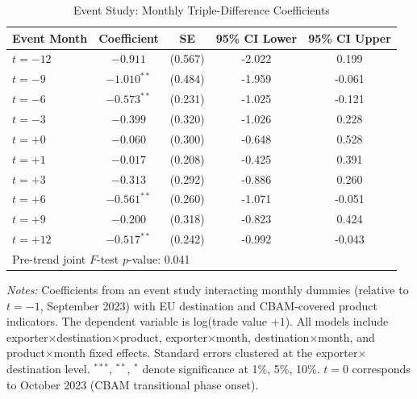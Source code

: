\begin{table}[htbp]
\centering
\caption{Event Study: Monthly Triple-Difference Coefficients}
\label{tab:eventstudy}
\begin{tabular}{lcccc}
\hline\hline
Event Month & Coefficient & SE & 95\% CI Lower & 95\% CI Upper \\
\hline
$t = -12$ & $-0.911$ & (0.567) & -2.022 & 0.199 \\
$t = -9$ & $-1.010^{**}$ & (0.484) & -1.959 & -0.061 \\
$t = -6$ & $-0.573^{**}$ & (0.231) & -1.025 & -0.121 \\
$t = -3$ & $-0.399$ & (0.320) & -1.026 & 0.228 \\
$t = +0$ & $-0.060$ & (0.300) & -0.648 & 0.528 \\
$t = +1$ & $-0.017$ & (0.208) & -0.425 & 0.391 \\
$t = +3$ & $-0.313$ & (0.292) & -0.886 & 0.260 \\
$t = +6$ & $-0.561^{**}$ & (0.260) & -1.071 & -0.051 \\
$t = +9$ & $-0.200$ & (0.318) & -0.823 & 0.424 \\
$t = +12$ & $-0.517^{**}$ & (0.242) & -0.992 & -0.043 \\
\hline
\multicolumn{5}{l}{Pre-trend joint $F$-test $p$-value: 0.041} \\
\hline\hline
\end{tabular}
\begin{tablenotes}[flushleft]
\small
\item \textit{Notes:} Coefficients from an event study interacting monthly dummies (relative to $t = -1$, September 2023) with EU destination and CBAM-covered product indicators. The dependent variable is log(trade value $+ 1$). All models include exporter$\times$destination$\times$product, exporter$\times$month, destination$\times$month, and product$\times$month fixed effects. Standard errors clustered at the exporter$\times$destination level. $^{***}$, $^{**}$, $^{*}$ denote significance at 1\%, 5\%, 10\%. $t = 0$ corresponds to October 2023 (CBAM transitional phase onset).
\end{tablenotes}
\end{table}
